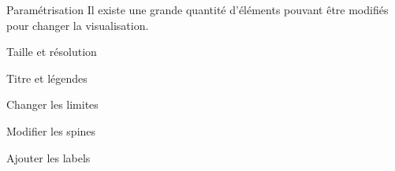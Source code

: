 \begin{frame}{Paramétrisation}
    Il existe une grande quantité d'éléments pouvant être modifiés pour changer la visualisation.
\end{frame}

\begin{frame}{Taille et résolution}
    \begin{minipage}[t]{0.49\linewidth}
    \end{minipage}
    \begin{minipage}[t]{0.49\linewidth}
    \end{minipage}
\end{frame} 

\begin{frame}{Titre et légendes}
    \begin{minipage}{0.49\linewidth}
    \end{minipage}
    \begin{minipage}{0.49\linewidth}
    \end{minipage}
\end{frame}

\begin{frame}{Changer les limites}
    \begin{minipage}{0.49\linewidth}
    \end{minipage}
    \begin{minipage}{0.49\linewidth}
    \end{minipage}
\end{frame}

\begin{frame}{Modifier les spines}
    \begin{minipage}{0.52\linewidth}
    \end{minipage}
    \begin{minipage}{0.46\linewidth}
    \end{minipage}
\end{frame}

\begin{frame}{Ajouter les labels}
    \begin{minipage}[c]{0.49\linewidth}
    \end{minipage}
    \begin{minipage}[c]{0.49\linewidth}
    \end{minipage}
\end{frame}

